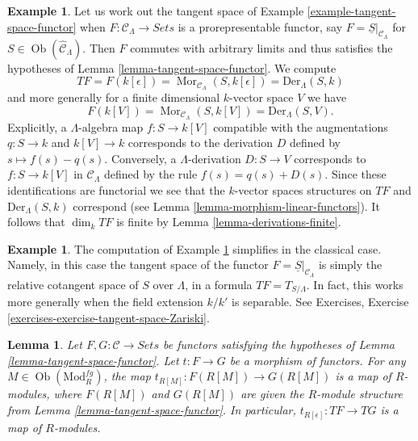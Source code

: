 \documentclass{stacks-project}
\theoremstyle{plain}
\newtheorem{lemma}[subsection]{Lemma}
\theoremstyle{definition}
\newtheorem{example}[subsection]{Example}
\theoremstyle{remark}
\numberwithin{equation}{subsection}
\def\Mor{\mathop{\mathrm{Mor}}\nolimits}
\def\Ob{\mathop{\mathrm{Ob}}\nolimits}
\begin{document}
\begin{example}
\label{example-tangent-space-prorepresentable-functor}
Let us work out the tangent space of
Example \ref{example-tangent-space-functor}
when $F : \mathcal{C}_\Lambda \to \textit{Sets}$ is a
prorepresentable functor, say $F = \underline{S}|_{\mathcal{C}_\Lambda}$
for $S \in \Ob(\widehat{\mathcal{C}}_\Lambda)$. Then $F$ commutes
with arbitrary limits and thus satisfies the hypotheses of
Lemma \ref{lemma-tangent-space-functor}.
We compute
$$
TF = F(k[\epsilon]) = \Mor_{\mathcal{C}_\Lambda}(S, k[\epsilon])
= \text{Der}_\Lambda(S, k)
$$
and more generally for a finite dimensional $k$-vector space $V$ we have
$$
F(k[V]) = \Mor_{\mathcal{C}_\Lambda}(S, k[V]) = \text{Der}_\Lambda(S, V).
$$
Explicitly, a $\Lambda$-algebra map $f : S \to k[V]$ compatible with
the augmentations $q : S \to k$ and $k[V] \to k$ corresponds to the derivation
$D$ defined by $s \mapsto f(s) - q(s)$. Conversely, a
$\Lambda$-derivation $D : S \to V$ corresponds to $f : S \to k[V]$
in $\mathcal{C}_\Lambda$ defined by the rule $f(s) = q(s) + D(s)$. Since
these identifications are functorial we see that the $k$-vector spaces
structures on $TF$ and $\text{Der}_\Lambda(S, k)$ correspond (see
Lemma \ref{lemma-morphism-linear-functors}).
It follows that $\dim_k TF$ is finite by
Lemma \ref{lemma-derivations-finite}.
\end{example}

\begin{example}
\label{example-tangent-space-classical-prorepresentable-functor}
The computation of
Example \ref{example-tangent-space-prorepresentable-functor}
simplifies in the classical case. Namely, in this case
the tangent space of the functor
$F = \underline{S}|_{\mathcal{C}_\Lambda}$ is simply the
relative cotangent space of $S$ over $\Lambda$, in a formula
$TF = T_{S/\Lambda}$. In fact, this works more generally when the
field extension $k/k'$ is separable. See
Exercises, Exercise \ref{exercises-exercise-tangent-space-Zariski}.
\end{example}

\begin{lemma}
\label{lemma-morphism-tangent-spaces}
Let $F, G: \mathcal{C} \to \textit{Sets}$ be functors satisfying
the hypotheses of
Lemma \ref{lemma-tangent-space-functor}.
Let $t : F \to G$ be a morphism of functors. For any
$M \in \Ob(\text{Mod}^{fg}_R)$, the map
$t_{R[M]}: F(R[M]) \to G(R[M])$ is a map of $R$-modules, where
$F(R[M])$ and $G(R[M])$ are given the $R$-module structure from
Lemma \ref{lemma-tangent-space-functor}.
In particular, $t_{R[\epsilon]} : TF \to TG$ is a map of $R$-modules.
\end{lemma}
\end{document}
